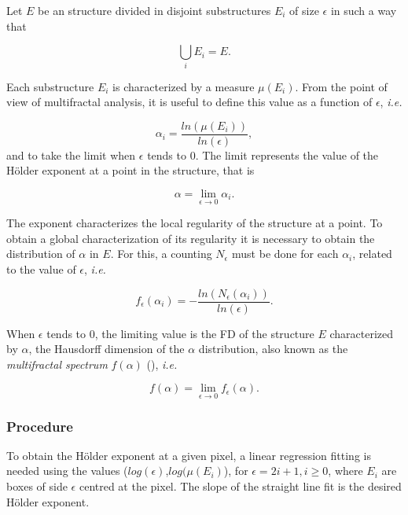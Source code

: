 \documentclass[oneside,a4paper,english,links,12pt]{article}
\begin{document}
Let $E$ be an structure divided in disjoint substructures $E_{i}$ of size $\epsilon$ in such a way that 

\begin{equation}
\displaystyle\bigcup_{i}E_{i} = E.
\end{equation}

Each substructure $E_{i}$ is characterized by a measure $\mu(E_{i})$. From the point of view of multifractal analysis, it is useful to define this value as a function of $\epsilon$, {\em i.e.}


\begin{equation}
\alpha_{i} = \frac{ln(\mu(E_{i}))}{ln(\epsilon)},
\label{eqn:eqn4}
\end{equation}
\noindent
and to take the limit when $\epsilon$ tends to $0$. The limit represents the value of the H\"older exponent at a point in the structure, that is

\begin{equation}
\alpha = \lim_{\epsilon\to0}{\alpha_{i}}.
\label{eqn:eqn5}
\end{equation}

The exponent characterizes the local regularity of the structure at a point. To obtain a global characterization of its regularity it is necessary to obtain the distribution of $\alpha$ in $E$. For this, a counting $N_{\epsilon}$ must be done for each $\alpha_{i}$, related to the value of $\epsilon$, {\em i.e.}

\begin{equation}
f_{\epsilon}(\alpha_{i}) = - \frac{ln(N_{\epsilon}(\alpha_{i}))}{ln(\epsilon)}.
\label{eqn:eqn6}
\end{equation}

When $\epsilon$ tends to $0$, the limiting value is the FD of the structure $E$ characterized by $\alpha$, the Hausdorff dimension of the $\alpha$ distribution, also known as the {\em multifractal spectrum} $f(\alpha)$ (\cite{Silvetti2010}), {\em i.e.}

\begin{equation}
f(\alpha) = \lim_{\epsilon\to0}{f_{\epsilon}(\alpha)}.
\label{eqn:eqn7}
\end{equation}

\subsubsection{Procedure}
To obtain the H\"older exponent at a given pixel, a linear regression fitting is needed using the values ($log(\epsilon)$,$log(\mu(E_{i})$), for $\epsilon = 2i + 1, i \ge 0$, where $E_{i}$ are boxes of side $\epsilon$ centred at the pixel. The slope of the straight line fit is the desired H\"older exponent.
\end{document}
